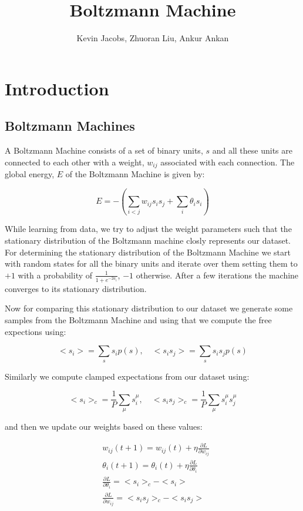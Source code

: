 \documentclass{article}
\title{Boltzmann Machine}
\author{Kevin Jacobs, Zhuoran Liu, Ankur Ankan}
\begin{document}
\section{Introduction}
\subsection{Boltzmann Machines}
A Boltzmann Machine consists of a set of binary units, $ s $ and all these units are 
connected to each other with a weight, $ w_{ij} $ associated with each connection.
The global energy, $ E $ of the Boltzmann Machine is given by:

$$ E = - \left(\sum_{i<j} w_{ij} s_i s_j + \sum_{i} \theta_i s_i \right) $$

While learning from data, we try to adjust the weight parameters such that the
stationary distribution of the Boltzmann machine closly represents our dataset.
For determining the stationary distribution of the Boltzmann Machine we start
with random states for all the binary units and iterate over them setting them
to $ +1 $ with a probability of $ \frac {1} {1 + e^{-2a_i}} $, $ -1 $ otherwise.
After a few iterations the machine converges to its stationary distribution.

Now for comparing this stationary distribution to our dataset we generate some
samples from the Boltzmann Machine and using that we compute the free expections
using:

$$ <s_i> = \sum_{s} s_i p(s), \quad <s_i s_j> = \sum_{s} s_i s_j p(s) $$

Similarly we compute clamped expectations from our dataset using:

$$ <s_i>_{c} = \frac{1}{P} \sum_{\mu} s_i^{\mu}, \quad <s_i s_j>_{c} = \frac{1}{P}
\sum_{\mu} s_i^{\mu} s_j^{\mu} $$

and then we update our weights based on these values:

\begin{equation} \begin{split}
& w_{ij} (t+1) = w_{ij}(t) + \eta \frac{\partial L}{\partial w_{ij}} \\
& \theta_i (t+1) = \theta_i (t) + \eta \frac{\partial L}{\partial \theta_i} \\
& \frac{\partial L}{\partial \theta_i} = <s_i>_c - <s_i> \\
& \frac{\partial L}{\partial w_{ij}} = <s_i s_j>_c - <s_i s_j> 
\end{split} \end{equation}
\end{document}
